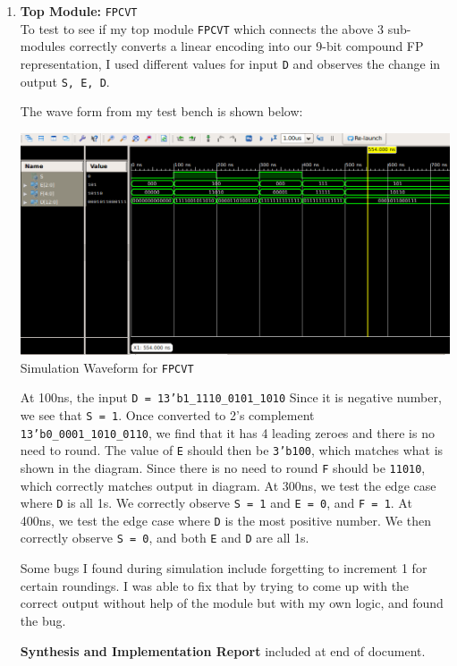 \documentclass{article}
\begin{document}
\begin{enumerate}
    \item \textbf{Top Module: } \texttt{FPCVT}  \\
    To test to see if my top module \texttt{FPCVT} which connects the above 3 sub-modules correctly converts a linear encoding into our 9-bit compound FP representation, I used different values for input \texttt{D} and observes the change in output \texttt{S, E, D}.\par
    The wave form from my test bench is shown below:
    \begin{center}
        \includegraphics[scale=0.4]{sim4.png} \\
        \caption{Simulation Waveform for \texttt{FPCVT}}
    \end{center}
    At 100ns, the input \texttt{D = 13'b1\_1110\_0101\_1010} Since it is negative number, we see that \texttt{S = 1}. Once converted to 2's complement \texttt{13'b0\_0001\_1010\_0110}, we find that it has 4 leading zeroes and there is no need to round. The value of \texttt{E} should then be \texttt{3'b100}, which matches what is shown in the diagram. Since there is no need to round \texttt{F} should be \texttt{11010}, which correctly matches output in diagram. At 300ns, we test the edge case where \texttt{D} is all 1s. We correctly observe \texttt{S = 1} and \texttt{E = 0}, and \texttt{F = 1}. At 400ns, we test the edge case where \texttt{D} is the most positive number. We then correctly observe \texttt{S = 0}, and both \texttt{E} and \texttt{D} are all 1s. \par
    Some bugs I found during simulation include forgetting to increment 1 for certain roundings. I was able to fix that by trying to come up with the correct output without help of the module but with my own logic, and found the bug. \par
    \textbf{Synthesis and Implementation Report} included at end of document.
\end{enumerate}
\end{document}

